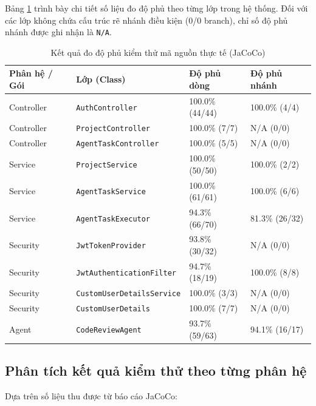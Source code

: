 \documentclass[12pt,a4paper]{report}
\begin{document}
Bảng \ref{tab:test_coverage} trình bày chi tiết số liệu đo độ phủ theo từng lớp trong hệ thống. Đối với các lớp không chứa cấu trúc rẽ nhánh điều kiện (0/0 branch), chỉ số độ phủ nhánh được ghi nhận là \texttt{N/A}.

\begin{table}[H]
\centering
\caption{Kết quả đo độ phủ kiểm thử mã nguồn thực tế (JaCoCo)}
\label{tab:test_coverage}
\renewcommand{\arraystretch}{1.2}
\begin{tabular}{|p{3.2cm}|p{4.6cm}|p{3.0cm}|p{2.8cm}|}
\hline
\textbf{Phân hệ / Gói} & \textbf{Lớp (Class)} & \textbf{Độ phủ dòng} & \textbf{Độ phủ nhánh} \\ \hline
Controller & \texttt{AuthController} & 100.0\% (44/44) & 100.0\% (4/4) \\ \hline
Controller & \texttt{ProjectController} & 100.0\% (7/7) & N/A (0/0) \\ \hline
Controller & \texttt{AgentTaskController} & 100.0\% (5/5) & N/A (0/0) \\ \hline
Service & \texttt{ProjectService} & 100.0\% (50/50) & 100.0\% (2/2) \\ \hline
Service & \texttt{AgentTaskService} & 100.0\% (61/61) & 100.0\% (6/6) \\ \hline
Service & \texttt{AgentTaskExecutor} & 94.3\% (66/70) & 81.3\% (26/32) \\ \hline
Security & \texttt{JwtTokenProvider} & 93.8\% (30/32) & N/A (0/0) \\ \hline
Security & \texttt{JwtAuthenticationFilter} & 94.7\% (18/19) & 100.0\% (8/8) \\ \hline
Security & \texttt{CustomUserDetailsService} & 100.0\% (3/3) & N/A (0/0) \\ \hline
Security & \texttt{CustomUserDetails} & 100.0\% (7/7) & N/A (0/0) \\ \hline
Agent & \texttt{CodeReviewAgent} & 93.7\% (59/63) & 94.1\% (16/17) \\ \hline
\end{tabular}
\end{table}

\subsection{Phân tích kết quả kiểm thử theo từng phân hệ}
Dựa trên số liệu thu được từ báo cáo JaCoCo:
\end{document}
